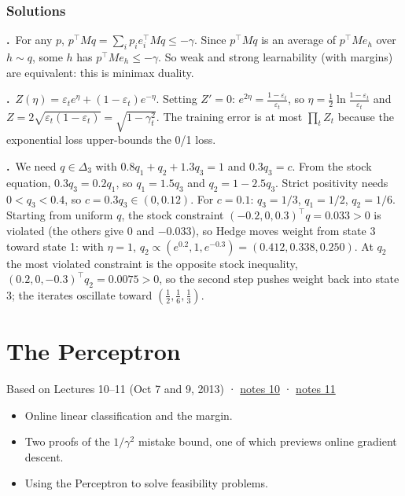 \documentclass[11pt,a4paper,openany]{book}
\newcommand{\eps}{\varepsilon}
\newcommand{\simplex}{\Delta}
\newcommand{\chapsource}[1]{{\small\sffamily\color{muted}#1\par}\medskip}
\newenvironment{solutions}{\small}{}
\newcommand{\sol}[2]{\par\smallskip\noindent\textbf{\sffamily #1.}\ #2\par}
\begin{document}
\subsection*{Solutions}
\begin{solutions}
\sol{7.1}{For any $p$, $p^\top Mq=\sum_ip_ie_i^\top Mq\le-\gamma$. Since $p^\top Mq$ is an average of $p^\top Me_h$ over $h\sim q$, some $h$ has $p^\top Me_h\le-\gamma$. So weak and strong learnability (with margins) are equivalent: this is minimax duality.}
\sol{7.2}{$Z(\eta)=\eps_te^{\eta}+(1-\eps_t)e^{-\eta}$. Setting $Z'=0$: $e^{2\eta}=\frac{1-\eps_t}{\eps_t}$, so $\eta=\frac12\ln\frac{1-\eps_t}{\eps_t}$ and $Z=2\sqrt{\eps_t(1-\eps_t)}=\sqrt{1-\gamma_t^2}$. The training error is at most $\prod_tZ_t$ because the exponential loss upper-bounds the 0/1 loss.}
\sol{7.3}{We need $q\in\simplex_3$ with $0.8q_1+q_2+1.3q_3=1$ and $0.3q_3=c$. From the stock equation, $0.3q_3=0.2q_1$, so $q_1=1.5q_3$ and $q_2=1-2.5q_3$. Strict positivity needs $0<q_3<0.4$, so $c=0.3q_3\in(0,0.12)$. For $c=0.1$: $q_3=1/3$, $q_1=1/2$, $q_2=1/6$. Starting from uniform $q$, the stock constraint $(-0.2,0,0.3)^\top q=0.033>0$ is violated (the others give $0$ and $-0.033$), so Hedge moves weight from state 3 toward state 1: with $\eta=1$, $q_2\propto(e^{0.2},1,e^{-0.3})=(0.412,0.338,0.250)$. At $q_2$ the most violated constraint is the opposite stock inequality, $(0.2,0,-0.3)^\top q_2=0.0075>0$, so the second step pushes weight back into state 3; the iterates oscillate toward $(\tfrac12,\tfrac16,\tfrac13)$.}
\end{solutions}

\chapter[The Perceptron]{The Perceptron}\label{ch8}
\chapsource{Based on Lectures 10–11 (Oct 7 and 9, 2013) · \href{https://web.eecs.umich.edu/~jabernet/eecs598course/fall2013/web/notes/lec10_100713.pdf}{notes 10} · \href{https://web.eecs.umich.edu/~jabernet/eecs598course/fall2013/web/notes/lec11_100913.pdf}{notes 11}}

\begin{goals}
\begin{itemize}
\item Online linear classification and the margin.
\item Two proofs of the $1/\gamma^2$ mistake bound, one of which previews online gradient descent.
\item Using the Perceptron to solve feasibility problems.
\end{itemize}
\end{goals}
\end{document}
